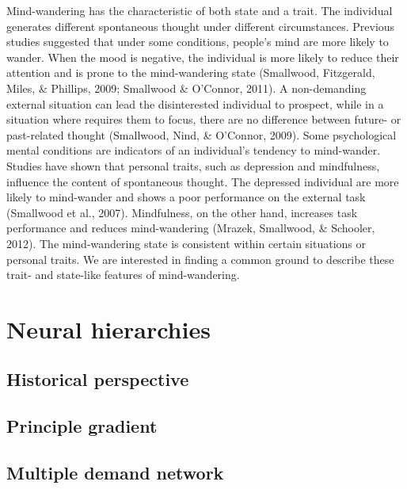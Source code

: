 Mind-wandering has the characteristic of both state and a trait. The individual generates different spontaneous thought under different circumstances. Previous studies suggested that under some conditions, people’s mind are more likely to wander. When the mood is negative, the individual is more likely to reduce their attention and is prone to the mind-wandering state (Smallwood, Fitzgerald, Miles, \& Phillips, 2009; Smallwood \& O’Connor, 2011). A non-demanding external situation can lead the disinterested individual to prospect, while in a situation where requires them to focus, there are no difference between future- or past-related thought (Smallwood, Nind, \& O’Connor, 2009). Some psychological mental conditions are indicators of an individual’s tendency to mind-wander.  Studies have shown that personal traits, such as depression and mindfulness, influence the content of spontaneous thought. The depressed individual are more likely to mind-wander and shows a poor performance on the external task (Smallwood et al., 2007). Mindfulness, on the other hand, increases task performance and reduces mind-wandering (Mrazek, Smallwood, \& Schooler, 2012). The mind-wandering state is consistent within certain situations or personal traits. We are interested in finding a common ground to describe these trait- and state-like features of mind-wandering.
\section{Neural hierarchies}
\label{intro:neural}

\subsection{Historical perspective}

\subsection{Principle gradient}

\subsection{Multiple demand network }

